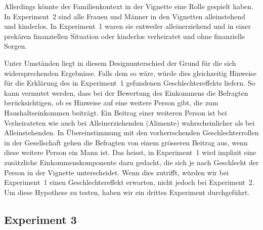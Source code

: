 \documentclass[a4paper,12pt]{article}
\renewcommand{\baselinestretch}{1.1}
\newif\ifcomments
\newcommand{\comment}[1]{%
    \ifcomments\marginpar{\renewcommand{\baselinestretch}{1}\tiny\hspace*{-1.1em}\colorbox{gray!20}%
    {\textcolor{red}{\parbox[t]{.9in}{\raggedright #1}}}}\fi}
\begin{document}
Allerdings könnte der Familienkontext in der Vignette eine Rolle gespielt
haben. In Experiment~2 sind alle Frauen und Männer in den Vignetten
alleinstehend und kinderlos. In Experiment~1 waren sie entweder alleinerziehend
und in einer prekären finanziellen Situation oder kinderlos verheiratet und
ohne finanzielle Sorgen.
\comment{Das Resultat könnte aber auch
    ein Artefakt sein aufgrund der Fragebogenkonstruktion: Bei Exp. 1 sollen die
    Leute in der Frage vor der Vignette angeben, was lohnrelevant sein soll. Zur
    Auswahl stehen Verdienst- und Bedürftigkeitskriterien. Bei Exp. 2 geht es in
    den beiden Fragen vor der Vignette zuerst um die Rechtfertigung von
    Managerlöhnen, im Vgl. zu denen Journi, Schreiner und Krankenschwester
    natürlich alle wenig verdienen und dann wird nach dem angenommenen
    Durchschnittseinkommen gefragt, was die Leute im Mittel auf 8'500.- schätzen,
    also auch viel höher als alle Vignetten. Dass sich deshalb die
    Geschlechterunterschiede aufheben ist jedoch längst nicht zwingend (v.a. weil
    die Bewertung insgesamt nur als leicht und nicht viel zu tief ausfällt).}

Unter Umständen liegt in diesem Designunterschied der Grund für die sich
widersprechenden Ergebnisse. Falls dem so wäre, würde dies gleichzeitig
Hinweise für die Erklärung des in Experiment~1 gefundenen Geschlechtereffekts
liefern. So kann vermutet werden, dass bei der Bewertung des Einkommens die
Befragten berücksichtigen, ob es Hinweise auf eine weitere Person gibt, die zum
Haushaltseinkommen beiträgt. Ein Beitrag einer weiteren Person ist bei
Verheirateten wie auch bei Alleinerziehenden (Alimente) wahrscheinlicher als
bei Alleinstehenden. In Übereinstimmung mit den vorherrschenden
Geschlechterrollen in der Gesellschaft gehen die Befragten von einem grösseren
Beitrag aus, wenn diese weitere Person ein Mann ist. Das heisst, in Experiment~1 
wird implizit eine zusätzliche Einkommenskomponente dazu gedacht, die sich je
nach Geschlecht der Person in der Vignette unterscheidet. Wenn dies zutrifft,
würden wir bei Experiment~1 einen Geschlechtereffekt erwarten, nicht jedoch bei
Experiment~2. Um diese Hypothese zu testen, haben wir ein drittes Experiment
durchgeführt.
\comment{copy-paste aus deinen PPT von Luzern 2014}
\comment{Wobei heutzutage bekommt man kaum mehr Alimente (aber das wissen die
    Leute vielleicht nicht – wusste ich jedenfalls nicht, bis ich da im
    Scheidungsprojekt mit Dorian gearbeitet habe)}


\subsection{Experiment 3}
\comment{Teile der Beschreibung der Daten könnten in den Abschnitt „Daten und Methode“}
\comment{„Offizielle“ Version der Umweltsurveys verwenden}
\end{document}
